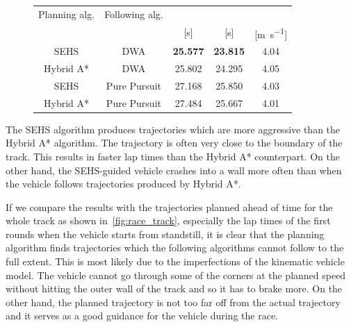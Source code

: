 \begin{figure}[h!]
	\centering
	\robustify\bfseries
	\begin{tabular}{c c S[detect-weight] S[detect-weight] S}
		\toprule
		Planning alg. & Following alg. &  &  &  \\
		 &  & [\si{\second}] & [\si{\second}] & [\si{\meter\per\second}]       \\
		\midrule
		SEHS & DWA & \bfseries 25.577 & \bfseries 23.815 & 4.04 \\
		Hybrid A* & DWA & 25.802 & 24.295 & 4.05 \\
		SEHS & Pure Pursuit & 27.168 & 25.850 & 4.03 \\
		Hybrid A* & Pure Pursuit & 27.484 & 25.667 & 4.01 \\
		\bottomrule
	\end{tabular}
\end{figure}

The SEHS algorithm produces trajectories which are more aggressive than the Hybrid A* algorithm. The trajectory is often very close to the boundary of the track. This results in faster lap times than the Hybrid A* counterpart. On the other hand, the SEHS-guided vehicle crashes into a wall more often than when the vehicle follows trajectories produced by Hybrid A*.

If we compare the results with the trajectories planned ahead of time for the whole track as shown in~\ref{fig:race_track}, especially the lap times of the first rounds when the vehicle starts from standstill, it is clear that the planning algorithm finds trajectories which the following algorithms cannot follow to the full extent. This is most likely due to the imperfections of the kinematic vehicle model. The vehicle cannot go through some of the corners at the planned speed without hitting the outer wall of the track and so it has to brake more. On the other hand, the planned trajectory is not too far off from the actual trajectory and it serves as a good guidance for the vehicle during the race.

